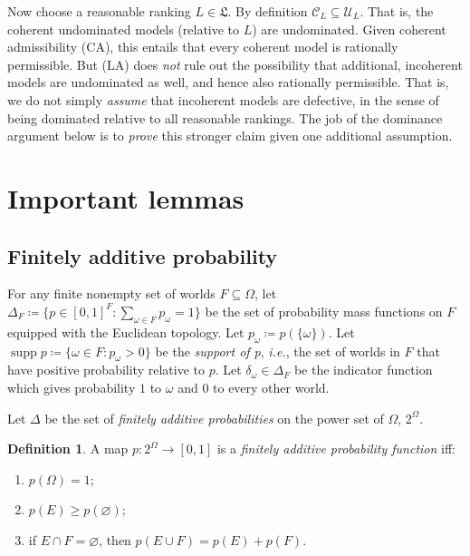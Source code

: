 \documentclass[11pt]{article}
\theoremstyle{definition}
\newtheorem{definition}[theorem]{Definition}
\theoremstyle{remark}
\newcommand{\C}{\mathcal C}
\newcommand{\U}{\mathcal U}
\newcommand{\supp}{\operatorname{supp}}
\begin{document}
Now choose a reasonable ranking $L\in\mathfrak L$. By definition $\C_L\subseteq\U_L$. That is, the coherent undominated models (relative to $L$) are undominated. Given coherent admissibility (CA), this entails that every coherent model is rationally permissible. But (LA) does \textit{not} rule out the possibility that additional, incoherent models are undominated as well, and hence also rationally permissible. That is, we do not simply \textit{assume} that incoherent models are defective, in the sense of being dominated relative to all reasonable rankings. The job of the dominance argument below is to \textit{prove} this stronger claim given one additional assumption.







\section{Important lemmas}\label{sec:lemmas}

\subsection{Finitely additive probability}\label{sec:prob}

For any finite nonempty set of worlds $F\subseteq\Omega$, let $\Delta_F\coloneqq\{p\in[0,1]^F:\sum_{\omega\in F}p_\omega=1\}$ be the set of probability mass functions on $F$ equipped with the Euclidean topology. Let $p_\omega\coloneqq p(\{\omega\})$. Let $\supp p\coloneqq\{\omega\in F:p_\omega>0\}$ be the \textit{support of p}, \textit{i.e.}, the set of worlds in $F$ that have positive probability relative to $p$. Let $\delta_\omega\in\Delta_F$ be the indicator function which gives probability $1$ to $\omega$ and $0$ to every other world.

Let $\Delta$ be the set of \emph{finitely additive probabilities} on the power set of $\Omega$, $2^\Omega$. 

\begin{definition}\label{def:finitely-additive-probability}
A map $p:2^\Omega\to[0,1]$ is a \emph{finitely additive probability function} iff:
\begin{enumerate}[label=\textup{(FA\arabic*)}]
  \item $p(\Omega)=1$;
  \item $p(E)\geq p(\varnothing)$;
  \item if $E\cap F=\varnothing$, then $p(E\cup F)=p(E)+p(F)$.
\end{enumerate}
\end{definition}
\end{document}

